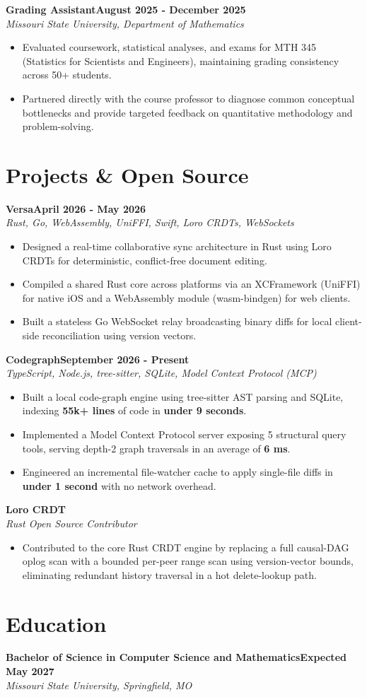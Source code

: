 \documentclass[letterpaper,10pt]{article}
\newcommand{\position}[3]{%
  \vspace{4pt}%
  {\bfseries #1}\hfill{\bfseries #3}\\[0pt]
  \textit{#2}\par
}
\begin{document}
\position{Grading Assistant}{Missouri State University, Department of Mathematics}{August 2025 - December 2025}
\begin{itemize}
  \item Evaluated coursework, statistical analyses, and exams for MTH 345 (Statistics for Scientists and Engineers), maintaining grading consistency across 50+ students.
  \item Partnered directly with the course professor to diagnose common conceptual bottlenecks and provide targeted feedback on quantitative methodology and problem-solving.
\end{itemize}

\section{Projects \& Open Source}

\position{Versa}{Rust, Go, WebAssembly, UniFFI, Swift, Loro CRDTs, WebSockets}{April 2026 - May 2026}
\begin{itemize}
  \item Designed a real-time collaborative sync architecture in Rust using Loro CRDTs for deterministic, conflict-free document editing.
  \item Compiled a shared Rust core across platforms via an XCFramework (UniFFI) for native iOS and a WebAssembly module (wasm-bindgen) for web clients.
  \item Built a stateless Go WebSocket relay broadcasting binary diffs for local client-side reconciliation using version vectors.
\end{itemize}

\position{Codegraph}{TypeScript, Node.js, tree-sitter, SQLite, Model Context Protocol (MCP)}{September 2026 - Present}
\begin{itemize}
  \item Built a local code-graph engine using tree-sitter AST parsing and SQLite, indexing \textbf{55k+ lines} of code in \textbf{under 9 seconds}.
  \item Implemented a Model Context Protocol server exposing 5 structural query tools, serving depth-2 graph traversals in an average of \textbf{6 ms}.
  \item Engineered an incremental file-watcher cache to apply single-file diffs in \textbf{under 1 second} with no network overhead.
\end{itemize}

\position{Loro CRDT}{Rust \enspace\textbar\enspace Open Source Contributor}{}
\begin{itemize}
  \item Contributed to the core Rust CRDT engine by replacing a full causal-DAG oplog scan with a bounded per-peer range scan using version-vector bounds, eliminating redundant history traversal in a hot delete-lookup path.
\end{itemize}

\section{Education}
\vspace{4pt}
{\bfseries Bachelor of Science in Computer Science and Mathematics}\hfill{\bfseries Expected May 2027}\\[0pt]
\textit{Missouri State University, Springfield, MO}\par
\end{document}
